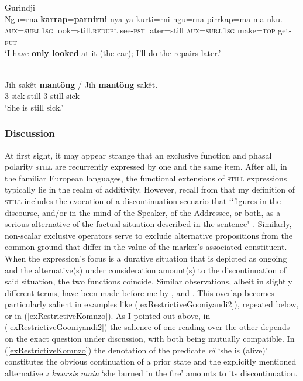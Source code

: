 \begin{exe}
	\ex Gurindji\label{exRestrictiveDisambiguation}\\
	\gll Ngu=rna \textbf{karrap}=\textbf{parnirni} nya-ya kurti=rni ngu=rna pirrkap=ma ma-nku.\\
	\textsc{aux}=\textsc{subj}.1\textsc{sg} look=still.\textsc{redupl} see-\textsc{pst} later=still \textsc{aux}=\textsc{subj}.1\textsc{sg} make=\textsc{top} get-\textsc{fut}\\
	\glt \lq I have \textbf{only looked} at it (the car); I’ll do the repairs later.'
	\\\parencite[23]{McConvell1983}
 
	\ex {}\label{exRestrictiveAcehnese}\\
	\gll Jih sakêt \textbf{mantöng} \textup{/} Jih \textbf{mantöng} sakêt.\\
	3 sick still {} 3 still sick\\
	\glt \lq She is still sick.\rq{ }\parencite[224]{Durie1985}
\end{exe}

\subsubsection{Discussion}
At first sight, it may appear strange that an exclusive function and phasal polarity \textsc{still} are recurrently expressed by one and the same item. After all, in the familiar European languages, the functional extensions of \textsc{still} expressions typically lie in the realm of additivity. However, recall from  that my definition of \textsc{still} includes the evocation of a discontinuation scenario that \lq\lq figures in the discourse, and/or in the mind of the Speaker, of the Addressee, or both, as a serious alternative of the factual situation described in the sentence" \parencite[41]{vanBaar1997}. Similarly, non-scalar exclusive operators serve to exclude alternative propositions from the common ground that differ in the value of the marker's associated constituent. When the expression's focus is a durative situation that is depicted as ongoing and the alternative(s) under consideration amount(s) to the discontinuation of said situation, the two functions coincide. Similar observations, albeit in slightly different terms, have been made before me by \textcite[336]{Doehler2018}, \textcite{McConvell1983} and \textcite{SchultzeBerndt2002}. This overlap  becomes particularly salient in examples like (\ref{exRestrictiveGooniyandi2}), repeated below, or in (\ref{exRestrictiveKomnzo}). As I pointed out above, in (\ref{exRestrictiveGooniyandi2})  the salience of one reading over the other depends on the exact question under discussion, with both being mutually compatible. In (\ref{exRestrictiveKomnzo}) the denotation of the predicate \textit{rä} \lq she is (alive)' constitutes the obvious continuation of a prior state and the explicitly mentioned alternative \textit{z} \textit{kwarsis} \textit{mnin} \lq she burned in the fire' amounts to its discontinuation.

